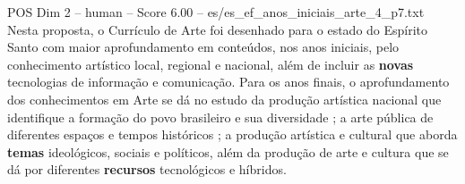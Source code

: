 \begin{textsample}{POS Dim 2 – human – Score 6.00 – es/es\_ef\_anos\_iniciais\_arte\_4\_p7.txt}  \label{ex:f2_pos_011}
Nesta proposta, o Currículo de Arte foi desenhado para o estado do Espírito Santo com maior aprofundamento em conteúdos, nos anos iniciais, pelo conhecimento artístico local, regional e nacional, além de incluir as \textbf{novas} tecnologias de informação e comunicação.
Para os anos finais, o aprofundamento dos conhecimentos em Arte se dá no estudo da produção artística nacional que identifique a formação do povo brasileiro e sua diversidade ; a arte pública de diferentes espaços e tempos históricos ; a produção artística e cultural que aborda \textbf{temas} ideológicos, sociais e políticos, além da produção de arte e cultura que se dá por diferentes \textbf{recursos} tecnológicos e híbridos.

\end{textsample}
